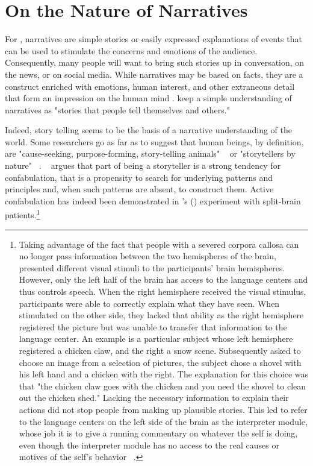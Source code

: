 \documentclass[11pt,a4paper,english,oneside]{book}
\numberwithin{equation}{chapter}
\begin{document}
\section{On the Nature of Narratives}\label{CH:2.1}

For \citeauthor{Shiller.2017}, narratives are simple stories or easily expressed explanations of events that can be used to stimulate the concerns and emotions of the audience. Consequently, many people will want to bring such stories up in conversation, on the news, or on social media. While narratives may be based on facts, they are a construct enriched with emotions, human interest, and other extraneous detail that form an impression on the human mind \cite[pp. 968--973]{Shiller.2017}. \citet[p. 58]{Akerlof.2016} keep a simple understanding of narratives as "stories that people tell themselves and others." 

Indeed, story telling seems to be the basis of a narrative understanding of the world. Some researchers go as far as to suggest that human beings, by definition, are "cause-seeking, purpose-forming, story-telling animals" ~\cite[p.~434]{Atran.2010} or "storytellers by nature" ~\cite[p.~27]{McAdams.1993}. 
~\citet[p.~434]{Atran.2010} argues that part of being a storyteller is a strong  tendency  for  confabulation,  that is a propensity to search for underlying patterns and principles and, when  such patterns are absent, to construct them. Active confabulation has indeed been demonstrated in \citeauthor{Gazzaniga.1985}'s (\citeyear{Gazzaniga.1985}) experiment with split-brain patients.\footnote{Taking advantage of the fact that people with a severed corpora callosa can no longer pass information between the two hemispheres of the brain, \citeauthor{Gazzaniga.1985} presented different visual stimuli to the participants' brain hemispheres. However, only the left half of the brain has access to the language centers and thus controls speech. When the right hemisphere received the visual stimulus, participants were able to correctly explain what they have seen. When stimulated on the other side, they lacked that ability as the right hemisphere registered the picture but was unable to transfer that information to the language center. An example is a particular subject whose left hemisphere registered a chicken claw, and the right a snow scene. Subsequently asked to choose an image from a selection of pictures, the subject chose a shovel with his left hand and a chicken with the right. The explanation for this choice was that "the chicken claw goes with the chicken and you need the shovel to clean out the chicken shed." Lacking the necessary information to explain their actions did not stop people from making up plausible stories. This led \citeauthor{Gazzaniga.1985} to refer to the language centers on the left side of the brain as the interpreter module, whose job it is to give a running commentary on whatever the self is doing, even though the interpreter module has no access to the real causes or motives of the self's behavior ~\citep{Gazzaniga.1985, GazzanigaM.IvryR.andMangunG..1998}.}
\end{document}
